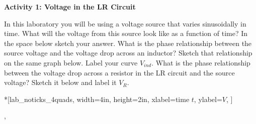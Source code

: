 \vspace{0.3cm}
{\centering {} \par}
\vspace{0.3cm}

\textbf{Activity 1: Voltage in the LR Circuit }

In this laboratory you will be using a voltage source that varies
sinusoidally in time.
What will the voltage from this source look like as a function
of time?
In the space below sketch your answer.
What is the phase relationship between the source voltage and the
voltage drop across an inductor?
Sketch that relationship on the same graph below.
Label your curve $V_{ind}$.
What is the phase relationship between the voltage drop
across a resistor in the LR circuit and the source voltage?
Sketch it below and label it $V_R$.

\begin{lab_axis}*[lab_noticks_4quads,
	width=4in, height=2in,
	xlabel=time $t$,
	ylabel=$V$,
]
\end{lab_axis},

